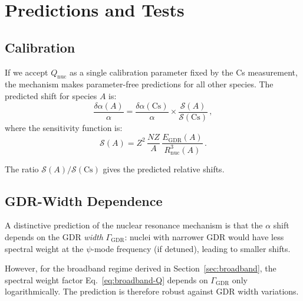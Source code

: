 \documentclass[aps,prd,twocolumn,superscriptaddress,nofootinbib]{revtex4-2}
\newcommand{\dalpha}{\delta\alpha}
\newcommand{\Qnuc}{Q_{\mathrm{nuc}}}
\newcommand{\Rnuc}{R_{\mathrm{nuc}}}
\newcommand{\EGDR}{E_{\mathrm{GDR}}}
\begin{document}
\section{Predictions and Tests}
\label{sec:predictions}

\subsection{Calibration}
\label{sec:calibration}

If we accept $\Qnuc$ as a single calibration parameter fixed by the
Cs measurement, the mechanism makes parameter-free predictions for
all other species.  The predicted shift for species $A$ is:
\begin{equation}\label{eq:prediction}
\frac{\dalpha(A)}{\alpha} = \frac{\dalpha(\mathrm{Cs})}{\alpha}
\times \frac{\mathcal{S}(A)}{\mathcal{S}(\mathrm{Cs})}\,,
\end{equation}
where the sensitivity function is:
\begin{equation}\label{eq:sensitivity}
\mathcal{S}(A) = Z^2\,\frac{NZ}{A}\,\frac{\EGDR(A)}{\Rnuc^3(A)}\,.
\end{equation}

The ratio $\mathcal{S}(A)/\mathcal{S}(\mathrm{Cs})$ gives the
predicted relative shifts.

\subsection{GDR-Width Dependence}
\label{sec:width-dep}

A distinctive prediction of the nuclear resonance mechanism is that
the $\alpha$ shift depends on the GDR \emph{width} $\Gamma_{\mathrm{GDR}}$:
nuclei with narrower GDR would have less spectral weight at the
$\psi$-mode frequency (if detuned), leading to smaller shifts.

However, for the broadband regime derived in Section~\ref{sec:broadband},
the spectral weight factor Eq.~\eqref{eq:broadband-Q} depends on
$\Gamma_{\mathrm{GDR}}$ only logarithmically.  The prediction is
therefore robust against GDR width variations.
\end{document}
